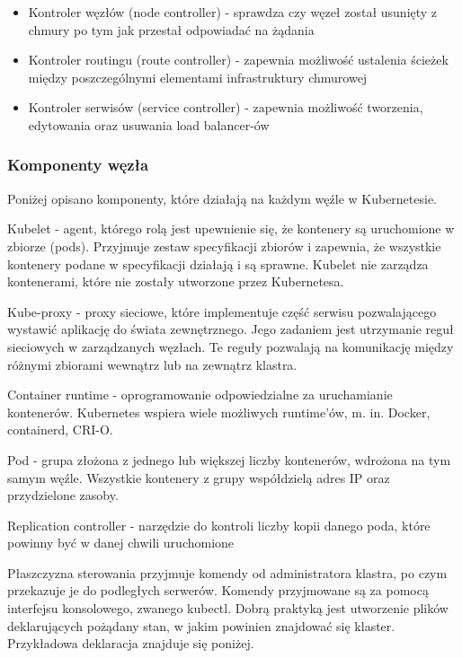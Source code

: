 \documentclass[11pt, a4]{article} %
\begin{document}
\begin{itemize} %
    \item Kontroler węzłów (node controller) - sprawdza czy węzeł został usunięty 
    z chmury po tym jak przestał odpowiadać na żądania
    \item Kontroler routingu (route controller) - zapewnia możliwość ustalenia ścieżek 
    między poszczególnymi elementami infrastruktury chmurowej
    \item Kontroler serwisów (service controller) - zapewnia możliwość 
    tworzenia, edytowania oraz usuwania load balancer-ów
\end{itemize}


\subsubsection{Komponenty węzła}

Poniżej opisano komponenty, które działają na każdym węźle w Kubernetesie.

Kubelet - agent, którego rolą jest upewnienie się, że kontenery są uruchomione 
w zbiorze (pods). Przyjmuje zestaw specyfikacji zbiorów i zapewnia, że wszystkie 
kontenery podane w specyfikacji działają i są sprawne. Kubelet nie zarządza 
kontenerami, które nie zostały utworzone przez Kubernetesa.

Kube-proxy - proxy sieciowe, które implementuje część serwisu pozwalającego wystawić 
aplikację do świata zewnętrznego. Jego zadaniem jest utrzymanie reguł sieciowych 
w zarządzanych węzłach. Te reguły pozwalają na komunikację między różnymi zbiorami 
wewnątrz lub na zewnątrz klastra.

Container runtime - oprogramowanie odpowiedzialne za uruchamianie kontenerów. 
Kubernetes wspiera wiele możliwych runtime'ów, m. in. Docker, containerd, CRI-O.

Pod - grupa złożona z jednego lub większej liczby kontenerów, wdrożona na tym samym 
węźle. Wszystkie kontenery z grupy współdzielą adres IP oraz przydzielone zasoby.

Replication controller - narzędzie do kontroli liczby kopii danego poda, które powinny 
być w danej chwili uruchomione

Płaszczyzna sterowania przyjmuje komendy od administratora klastra, po czym przekazuje 
je do podległych serwerów. Komendy przyjmowane są za pomocą interfejsu 
konsolowego, zwanego kubectl. Dobrą praktyką jest utworzenie plików deklarujących 
pożądany stan, w jakim powinien znajdować się klaster. Przykładowa deklaracja znajduje 
się poniżej.
\end{document}
